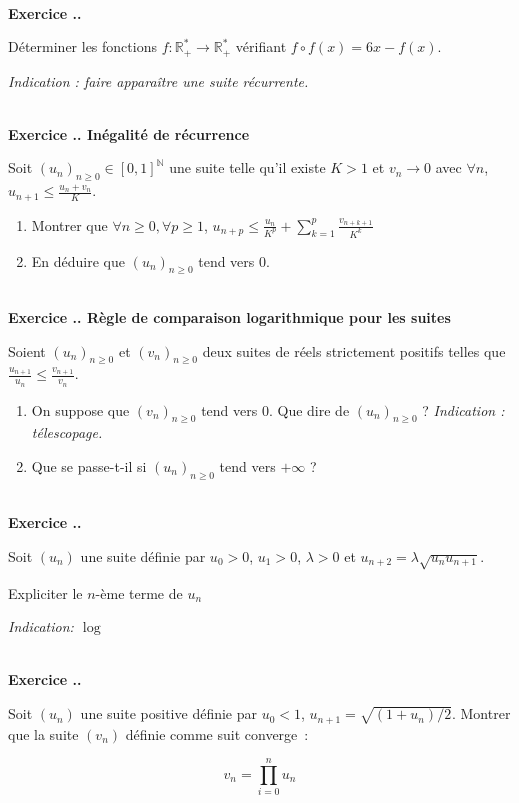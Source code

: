 \documentclass{article}
\newcommand{\mb}[1]{\mathbb{#1}}
\newcounter{exo}
\newcommand{\exercice}[1][\null]{\textbf{\\ Exercice \thesection.\theexo. #1} \addtocounter{exo}{1}}
\begin{document}
\exercice

Déterminer les fonctions $f : \mb{R}_+^* \rightarrow \mb{R}_+^*$ vérifiant $f \circ f(x) = 6x - f(x)$.

\emph{Indication :  faire apparaître une suite récurrente.}


\exercice[Inégalité de récurrence]

Soit $(u_n)_{n \ge 0} \in [0,1]^{\mb{N}}$ une suite telle qu'il existe $K > 1$ et $v_n \rightarrow 0$ avec $\forall n$, $u_{n+1} \le \frac{u_{n} + v_n}{K}$.

\begin{enumerate}

\item Montrer que $\forall n \ge 0, \forall p \ge 1$, $u_{n+p} \le \frac{u_n}{K^p} + \sum_{k=1}^p \frac{v_{n+k+1}}{K^k}$

\item En déduire que $(u_n)_{n \ge 0}$ tend vers $0$.

\end{enumerate}

\exercice[Règle de comparaison logarithmique pour les suites]

Soient $(u_n)_{n \ge 0}$ et $(v_n)_{n \ge 0}$ deux suites de réels strictement positifs telles que $\frac{u_{n+1}}{u_n} \le \frac{v_{n+1}}{v_n}$.

\begin{enumerate}

\item On suppose que $(v_n)_{n \ge 0}$ tend vers $0$. Que dire de $(u_n)_{n \ge 0}$ ? \emph{Indication : télescopage.}

\item Que se passe-t-il si $(u_n)_{n \ge 0}$ tend vers $+ \infty$ ?

\end{enumerate}



\exercice 

Soit $(u_n)$ une suite définie par $u_0 > 0$, $u_1 > 0$, $\lambda > 0$
et $u_{n+2} = \lambda \sqrt{u_n u_{n+1}}$.

Expliciter le $n$-ème terme de $u_n$

\emph{Indication: $\log$}

\exercice 

Soit $(u_n)$ une suite positive définie par $u_0 < 1$,
$u_{n+1} = \sqrt{(1 + u_n) / 2}$. 
Montrer que la suite $(v_n)$ définie comme suit converge~:

\begin{equation*}
    v_n = \prod_{i = 0}^n u_n
\end{equation*}
\end{document}
